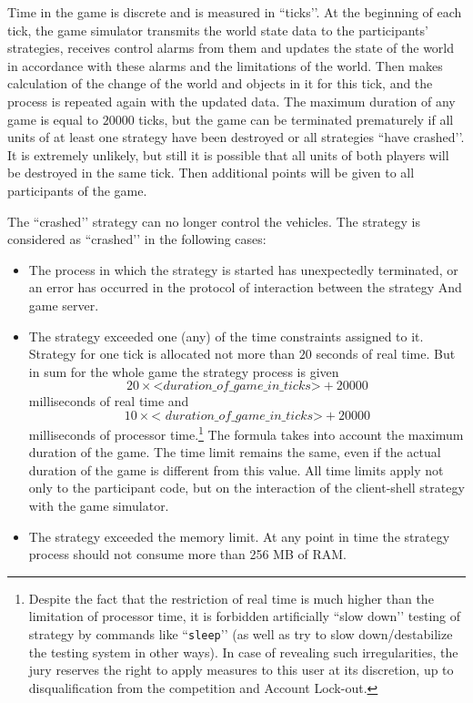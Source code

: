 Time in the game is discrete and is measured in ``ticks’’. At the beginning of each tick, the game simulator transmits the world state data to the participants' strategies,
receives control alarms from them and updates the state of the world in accordance with these alarms and the limitations of the world. Then makes
calculation of the change of the world and objects in it for this tick, and the process is repeated again with the updated data. The maximum duration of any game
is equal to $20000$ ticks, but the game can be terminated prematurely if all units of at least one strategy have been destroyed or all strategies
``have crashed’’. It is extremely unlikely, but still it is possible that all units of both players will be destroyed in the same tick. Then additional
points will be given to all participants of the game.

The ``crashed’’ strategy can no longer control the vehicles. The strategy is considered as ``crashed’’ in the following cases:
\begin{itemize}
  \item The process in which the strategy is started has unexpectedly terminated, or an error has occurred in the protocol of interaction between the strategy
        And game server.
  \item The strategy exceeded one (any) of the time constraints assigned to it. Strategy for one tick is allocated not more than $20$ seconds
        of real time. But in sum for the whole game the strategy process is given
        \begin{equation}
        20\times\textit{<duration\_of\_game\_in\_ticks>}+20000
        \end{equation}
        milliseconds of real time and
        \begin{equation}
        10\times\textit{< duration\_of\_game\_in\_ticks>}+20000
        \end{equation}
        milliseconds of processor time.\footnote[1]{Despite the fact that the restriction of real time is much higher than the limitation
        of processor time, it is forbidden artificially ``slow down’’ testing of strategy by commands like ``\texttt{sleep}’’ (as well as
        try to slow down/destabilize the testing system in other ways). In case of revealing such irregularities, the jury
        reserves the right to apply measures to this user at its discretion, up to disqualification from the competition and
        Account Lock-out.} The formula takes into account the maximum duration of the game. The time limit remains the same, even if
        the actual duration of the game is different from this value. All time limits apply not only to the participant code, but
        on the interaction of the client-shell strategy with the game simulator.
  \item The strategy exceeded the memory limit. At any point in time the strategy process should not consume more than 256 MB of RAM.
\end{itemize}

